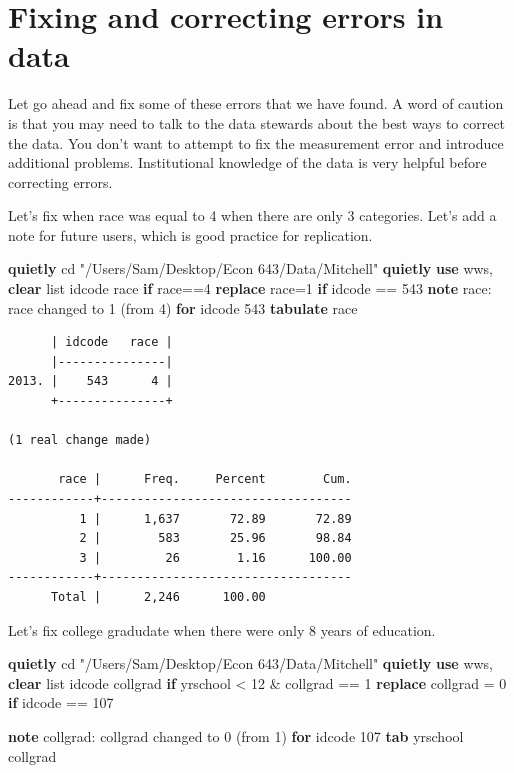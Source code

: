 \documentclass[
]{book}
\newenvironment{Shaded}{\begin{snugshade}}{\end{snugshade}}
\newcommand{\KeywordTok}[1]{\textcolor[rgb]{0.13,0.29,0.53}{\textbf{#1}}}
\newcommand{\NormalTok}[1]{#1}
\newcommand{\OtherTok}[1]{\textcolor[rgb]{0.56,0.35,0.01}{#1}}
\newcommand{\StringTok}[1]{\textcolor[rgb]{0.31,0.60,0.02}{#1}}
\begin{document}
\section{Fixing and correcting errors in data}\label{fixing-and-correcting-errors-in-data}

Let go ahead and fix some of these errors that we have found. A word of caution is that you may need to talk to the data stewards about the best ways to correct the data. You don't want to attempt to fix the measurement error and introduce additional problems. Institutional knowledge of the data is very helpful before correcting errors.

Let's fix when race was equal to 4 when there are only 3 categories. Let's add a note for future users, which is good practice for replication.

\begin{Shaded}
\begin{Highlighting}[]
\KeywordTok{quietly}\NormalTok{ cd }\StringTok{"/Users/Sam/Desktop/Econ 643/Data/Mitchell"}
\KeywordTok{quietly} \KeywordTok{use}\NormalTok{ wws, }\KeywordTok{clear}
\OtherTok{list}\NormalTok{ idcode race }\KeywordTok{if}\NormalTok{ race==4}
\KeywordTok{replace}\NormalTok{ race=1 }\KeywordTok{if}\NormalTok{ idcode == 543}
\KeywordTok{note}\NormalTok{ race: race changed to 1 (from 4) }\KeywordTok{for}\NormalTok{ idcode 543}
\KeywordTok{tabulate}\NormalTok{ race}
\end{Highlighting}
\end{Shaded}

\begin{verbatim}
      | idcode   race |
      |---------------|
2013. |    543      4 |
      +---------------+

(1 real change made)

       race |      Freq.     Percent        Cum.
------------+-----------------------------------
          1 |      1,637       72.89       72.89
          2 |        583       25.96       98.84
          3 |         26        1.16      100.00
------------+-----------------------------------
      Total |      2,246      100.00
\end{verbatim}

Let's fix college gradudate when there were only 8 years of education.

\begin{Shaded}
\begin{Highlighting}[]
\KeywordTok{quietly}\NormalTok{ cd }\StringTok{"/Users/Sam/Desktop/Econ 643/Data/Mitchell"}
\KeywordTok{quietly} \KeywordTok{use}\NormalTok{ wws, }\KeywordTok{clear}
\OtherTok{list}\NormalTok{ idcode collgrad }\KeywordTok{if}\NormalTok{ yrschool \textless{} 12 \& collgrad == 1}
\KeywordTok{replace}\NormalTok{ collgrad = 0 }\KeywordTok{if}\NormalTok{ idcode == 107}

\KeywordTok{note}\NormalTok{ collgrad: collgrad changed to 0 (from 1) }\KeywordTok{for}\NormalTok{ idcode 107}
\KeywordTok{tab}\NormalTok{ yrschool collgrad}
\end{Highlighting}
\end{Shaded}
\end{document}

